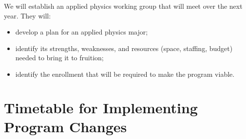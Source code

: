 \documentclass[12pt]{article}
\begin{document}
We will establish an applied physics working group that will meet over the next year.  They will:
\vspace*{-.4cm}
\begin{itemize}
\vspace*{-.2cm}\item  develop a plan for an applied physics major; 
\vspace*{-.2cm}\item  identify its strengths, weaknesses, and resources (space, staffing, budget) needed to bring it to fruition;
\vspace*{-.2cm}\item  identify the enrollment that will be required to make the program viable.
\end{itemize}










\newpage
\section{Timetable for Implementing Program Changes}
\end{document}
